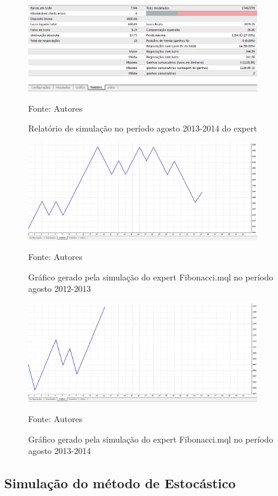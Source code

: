\begin{figure}[htp]
\centering
\includegraphics[width=0.9\textwidth]{figuras/protocoloFib2}
\caption{Relatório de simulação no período agosto 2013-2014 do expert}{Fonte: Autores} 
\label{protocoloFib2}
\end{figure}

\begin{figure}[htp]
\centering
\includegraphics[width=0.9\textwidth]{figuras/protocoloFib3}
\caption{Gráfico gerado pela simulação do expert Fibonacci.mql no período agosto 2012-2013}{Fonte: Autores} 
\label{protocoloFib3}
\end{figure}

\begin{figure}[htp]
\centering
\includegraphics[width=0.9\textwidth]{figuras/protocoloFib4}
\caption{Gráfico gerado pela simulação do expert Fibonacci.mql no período agosto 2013-2014}{Fonte: Autores} 
\label{protocoloFib4}
\end{figure}

\subsection{Simulação do método de Estocástico}

